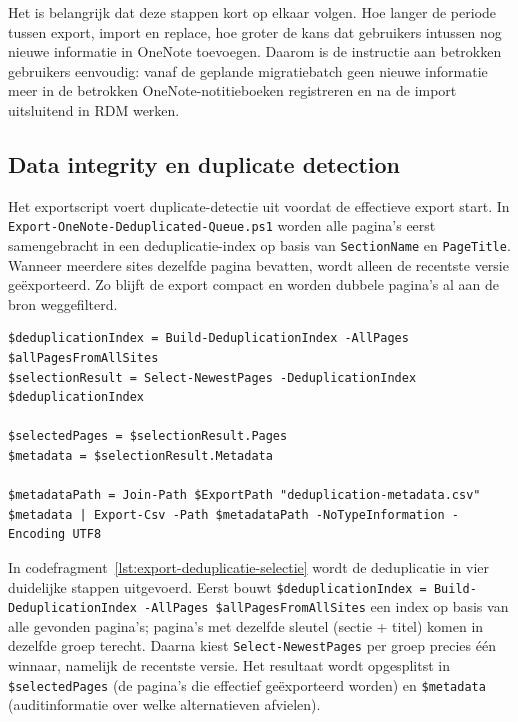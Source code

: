 Het is belangrijk dat deze stappen kort op elkaar volgen. Hoe langer de periode tussen export, import en replace, hoe groter de kans dat gebruikers intussen nog nieuwe informatie in OneNote toevoegen. Daarom is de instructie aan betrokken gebruikers eenvoudig: vanaf de geplande migratiebatch geen nieuwe informatie meer in de betrokken OneNote-notitieboeken registreren en na de import uitsluitend in RDM werken.

\subsection{Data integrity en duplicate detection}
\label{subsec:topic-data-integrity-duplicates}

Het exportscript voert duplicate-detectie uit voordat de effectieve export start. In \texttt{Export-OneNote-Deduplicated-Queue.ps1} worden alle pagina's eerst samengebracht in een deduplicatie-index op basis van \texttt{SectionName} en \texttt{PageTitle}. Wanneer meerdere sites dezelfde pagina bevatten, wordt alleen de recentste versie geëxporteerd. Zo blijft de export compact en worden dubbele pagina's al aan de bron weggefilterd.

\begin{listing}[htbp]
\begin{lstlisting}
$deduplicationIndex = Build-DeduplicationIndex -AllPages $allPagesFromAllSites
$selectionResult = Select-NewestPages -DeduplicationIndex $deduplicationIndex

$selectedPages = $selectionResult.Pages
$metadata = $selectionResult.Metadata

$metadataPath = Join-Path $ExportPath "deduplication-metadata.csv"
$metadata | Export-Csv -Path $metadataPath -NoTypeInformation -Encoding UTF8
\end{lstlisting}
\caption{Duplicate-detectie en selectie van de nieuwste versie in de exportqueue}
\label{lst:export-deduplicatie-selectie}
\end{listing}

In codefragment~\ref{lst:export-deduplicatie-selectie} wordt de deduplicatie in vier duidelijke stappen uitgevoerd. Eerst bouwt \texttt{\$deduplicationIndex = Build-DeduplicationIndex -AllPages \$allPagesFromAllSites} een index op basis van alle gevonden pagina's; pagina's met dezelfde sleutel (sectie + titel) komen in dezelfde groep terecht. Daarna kiest \texttt{Select-NewestPages} per groep precies één winnaar, namelijk de recentste versie. Het resultaat wordt opgesplitst in \texttt{\$selectedPages} (de pagina's die effectief geëxporteerd worden) en \texttt{\$metadata} (auditinformatie over welke alternatieven afvielen).

